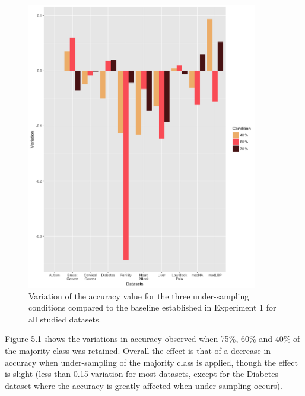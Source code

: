 \begin{figure}[!htbp]
    \centering
    \includegraphics[width=0.9\textwidth]{ThesisTemplate/usingLatex/chapter5Images/AccuVariationUnderBySets.png}
    \caption{Variation of the accuracy value for the three under-sampling conditions compared to the baseline established in Experiment 1 for all studied datasets.}
    \label{fig:my_label}
\end{figure}

Figure 5.1 shows the variations in accuracy observed when 75\%, 60\% and 40\% of the majority class was retained.
Overall the effect is that of a decrease in accuracy when under-sampling of the  majority class is applied, though the effect is slight (less than 0.15 variation for most datasets, except for the Diabetes dataset where the accuracy is greatly affected when under-sampling occurs).\newline



